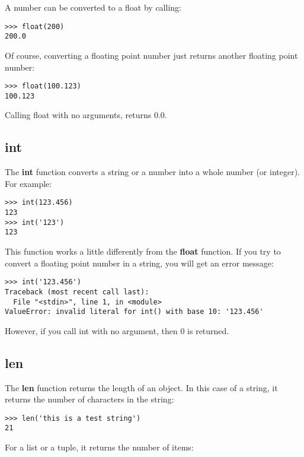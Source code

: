 \noindent
A number can be converted to a float by calling:

\begin{Verbatim}[frame=single]
>>> float(200)
200.0
\end{Verbatim}

\noindent
Of course, converting a floating point number just returns another floating point number:

\begin{Verbatim}[frame=single]
>>> float(100.123)
100.123
\end{Verbatim}

\noindent
Calling float with no arguments, returns 0.0.

\subsection*{int}

The \textbf{int} function converts a string or a number into a whole number (or integer). For example:

\begin{Verbatim}[frame=single]
>>> int(123.456)
123
>>> int('123')
123
\end{Verbatim}

This function works a little differently from the \textbf{float} function. If you try to convert a floating point number in a string, you will get an error message:

\begin{Verbatim}[frame=single]
>>> int('123.456')
Traceback (most recent call last):
  File "<stdin>", line 1, in <module>
ValueError: invalid literal for int() with base 10: '123.456'
\end{Verbatim}

\noindent
However, if you call int with no argument, then 0 is returned.

\subsection*{len}

The \textbf{len} function returns the length of an object. In this case of a string, it returns the number of characters in the string:

\begin{Verbatim}[frame=single]
>>> len('this is a test string')
21
\end{Verbatim}

\noindent
For a list or a tuple, it returns the number of items:

